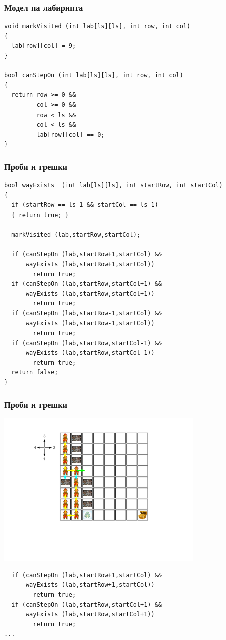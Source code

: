 \documentclass{beamer}
\begin{document}
\begin{frame}[fragile]
\frametitle{Модел на лабиринта}
\begin{lstlisting}
void markVisited (int lab[ls][ls], int row, int col)
{
  lab[row][col] = 9;
}

bool canStepOn (int lab[ls][ls], int row, int col)
{
  return row >= 0 &&
         col >= 0 && 
         row < ls &&
         col < ls &&
         lab[row][col] == 0;
}
\end{lstlisting}

\end{frame}


\begin{frame}[fragile]
\frametitle{Проби и грешки}
\begin{lstlisting}
bool wayExists  (int lab[ls][ls], int startRow, int startCol)
{
  if (startRow == ls-1 && startCol == ls-1)
  { return true; }

  markVisited (lab,startRow,startCol);

  if (canStepOn (lab,startRow+1,startCol) && 
      wayExists (lab,startRow+1,startCol))
        return true;
  if (canStepOn (lab,startRow,startCol+1) && 
      wayExists (lab,startRow,startCol+1))
        return true;
  if (canStepOn (lab,startRow-1,startCol) && 
      wayExists (lab,startRow-1,startCol))
        return true;
  if (canStepOn (lab,startRow,startCol-1) && 
      wayExists (lab,startRow,startCol-1))
        return true;
  return false;
}
\end{lstlisting}
\end{frame}



\begin{frame}[fragile]
\frametitle{Проби и грешки}
\vspace{-20px}
\begin{flushright}
  \includegraphics[width=10cm]{images/lab_st_02}
\end{flushright}
\vspace{-60px}
\begin{lstlisting}
  if (canStepOn (lab,startRow+1,startCol) && 
      wayExists (lab,startRow+1,startCol))
        return true;
  if (canStepOn (lab,startRow,startCol+1) && 
      wayExists (lab,startRow,startCol+1))
        return true;
...
\end{lstlisting}
\end{frame}
\end{document}
